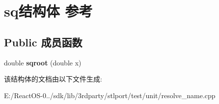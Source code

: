 \hypertarget{structsq}{}\section{sq结构体 参考}
\label{structsq}
\subsection*{Public 成员函数}
\begin{DoxyCompactItemize}
\item 
\mbox{\label{structsq_a096a89faa770003dca73cfdbce8cebec}} 
double {\bfseries sqroot} (double x)
\end{DoxyCompactItemize}


该结构体的文档由以下文件生成\+:\begin{DoxyCompactItemize}
\item 
E\+:/\+React\+O\+S-\/0../sdk/lib/3rdparty/stlport/test/unit/resolve\+\_\+name.\+cpp\end{DoxyCompactItemize}
